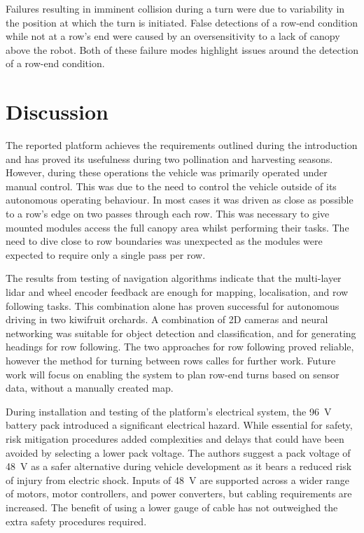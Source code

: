 \documentclass[preprint,authoryear,12pt]{elsarticle}
\begin{document}
    Failures resulting in imminent collision during a turn were due to variability in the position at which the turn is initiated.
    False detections of a row-end condition while not at a row's end were caused by an oversensitivity to a lack of canopy above the robot.
    Both of these failure modes highlight issues around the detection of a row-end condition.


\section{Discussion}
\label{sect:discussion}

    The reported platform achieves the requirements outlined during the introduction and has proved its usefulness during two pollination and harvesting seasons.
    However, during these operations the vehicle was primarily operated under manual control.
    This was due to the need to control the vehicle outside of its autonomous operating behaviour.
    In most cases it was driven as close as possible to a row's edge on two passes through each row.
    This was necessary to give mounted modules access the full canopy area whilst performing their tasks.
    The need to dive close to row boundaries was unexpected as the modules were expected to require only a single pass per row.

    The results from testing of navigation algorithms indicate that the multi-layer lidar and wheel encoder feedback are enough for mapping, localisation, and row following tasks.
    This combination alone has proven successful for autonomous driving in two kiwifruit orchards.
    A combination of 2D cameras and neural networking was suitable for object detection and classification, and for generating headings for row following.
    The two approaches for row following proved reliable, however the method for turning between rows calles for further work.
    Future work will focus on enabling the system to plan row-end turns based on sensor data, without a manually created map.

    During installation and testing of the platform's electrical system, the \SI{96}{\volt} battery pack introduced a significant electrical hazard.
    While essential for safety, risk mitigation procedures added complexities and delays that could have been avoided by selecting a lower pack voltage.
    The authors suggest a pack voltage of \SI{48}{\volt} as a safer alternative during vehicle development as it bears a reduced risk of injury from electric shock.
    Inputs of \SI{48}{\volt} are supported across a wider range of motors, motor controllers, and power converters, but cabling requirements are increased.
    The benefit of using a lower gauge of cable has not outweighed the extra safety procedures required.
\end{document}
